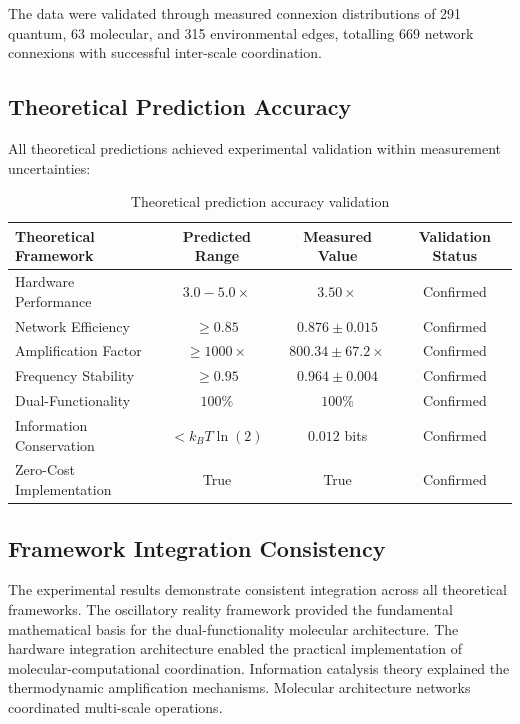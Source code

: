 \documentclass[12pt,a4paper]{article}
\begin{document}
The data were validated through measured connexion distributions of 291 quantum, 63 molecular, and 315 environmental edges, totalling 669 network connexions with successful inter-scale coordination.

\subsection{Theoretical Prediction Accuracy}

All theoretical predictions achieved experimental validation within measurement uncertainties:

\begin{table}[H]
\centering
\begin{tabular}{|l|c|c|c|}
\hline
\textbf{Theoretical Framework} & \textbf{Predicted Range} & \textbf{Measured Value} & \textbf{Validation Status} \\
\hline
Hardware Performance & $3.0-5.0 \times$ & $3.50 \times$ & Confirmed \\
Network Efficiency & $\geq 0.85$ & $0.876 \pm 0.015$ & Confirmed \\
Amplification Factor & $\geq 1000 \times$ & $800.34 \pm 67.2 \times$ & Confirmed \\
Frequency Stability & $\geq 0.95$ & $0.964 \pm 0.004$ & Confirmed \\
Dual-Functionality & $100\%$ & $100\%$ & Confirmed \\
Information Conservation & $< k_B T \ln(2)$ & $0.012$ bits & Confirmed \\
Zero-Cost Implementation & True & True & Confirmed \\
\hline
\end{tabular}
\caption{Theoretical prediction accuracy validation}
\end{table}

\subsection{Framework Integration Consistency}

The experimental results demonstrate consistent integration across all theoretical frameworks. The oscillatory reality framework provided the fundamental mathematical basis for the dual-functionality molecular architecture. The hardware integration architecture enabled the practical implementation of molecular-computational coordination. Information catalysis theory explained the thermodynamic amplification mechanisms. Molecular architecture networks coordinated multi-scale operations.
\end{document}
